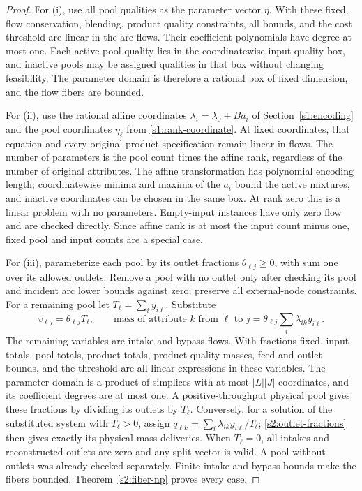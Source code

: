 \begin{proof}
For (i), use all pool qualities as the parameter vector $\eta$.
With these fixed, flow conservation, blending, product quality
constraints, all bounds, and the cost threshold are linear in the
arc flows. Their coefficient polynomials have degree at most one.
Each active pool quality lies in the coordinatewise input-quality
box, and inactive pools may be assigned qualities in that box without
changing feasibility. The parameter domain is therefore a rational
box of fixed dimension, and the flow fibers are bounded.

For (ii), use the rational affine coordinates
$\lambda_i=\lambda_0+Ba_i$ of Section~\ref{s1:encoding} and the
pool coordinates $\eta_\ell$ from \eqref{s1:rank-coordinate}.
At fixed coordinates, that equation and every original product
specification remain linear in flows. The number of parameters is
the pool count times the affine rank, regardless of the number of
original attributes. The affine transformation has polynomial
encoding length; coordinatewise minima and maxima of the $a_i$
bound the active mixtures, and inactive coordinates can be chosen
in the same box. At rank zero this is a linear problem with no
parameters. Empty-input instances have only zero flow and are checked
directly. Since affine rank is at most the input count minus one,
fixed pool and input counts are a special case.

For (iii), parameterize each pool by its outlet fractions
$\theta_{\ell j}\ge0$, with sum one over its allowed outlets.
Remove a pool with no outlet only after checking its pool and incident
arc lower bounds against zero; preserve all external-node constraints.
For a remaining pool let $T_\ell=\sum_i y_{i\ell}$. Substitute
\begin{equation}
 v_{\ell j}=\theta_{\ell j}T_\ell,\qquad
 \text{mass of attribute }k\text{ from }\ell\text{ to }j
   =\theta_{\ell j}\sum_i\lambda_{ik}y_{i\ell}.
 \label{s2:outlet-fractions}
\end{equation}
The remaining variables are intake and bypass flows. With fractions
fixed, input totals, pool totals, product totals, product quality
masses, feed and outlet bounds, and the threshold are all linear
expressions in these variables. The parameter domain is a product
of simplices with at most $|L||J|$ coordinates, and its coefficient
degrees are at most one. A positive-throughput physical pool gives
these fractions by dividing its outlets by $T_\ell$. Conversely,
for a solution of the substituted system with $T_\ell>0$, assign
$q_{\ell k}=\sum_i\lambda_{ik}y_{i\ell}/T_\ell$;
\eqref{s2:outlet-fractions} then gives exactly its physical mass
deliveries. When $T_\ell=0$, all intakes and reconstructed outlets
are zero and any split vector is valid. A pool without outlets was
already checked separately. Finite intake and bypass bounds make
the fibers bounded. Theorem~\ref{s2:fiber-np} proves every case.
\end{proof}

